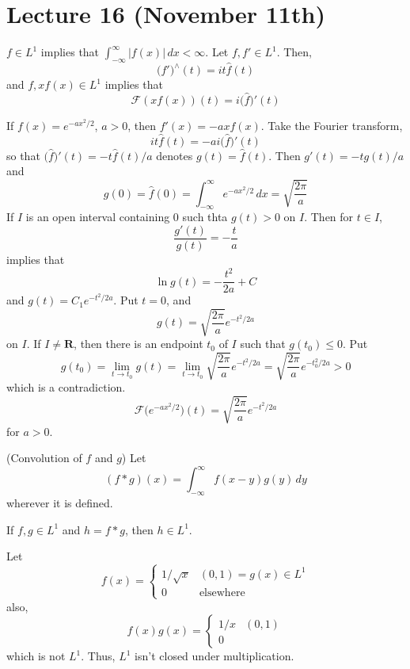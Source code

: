 \section{Lecture 16 (November 11th)}
\begin{thm}
$f\in L^{1}$ implies that $\int ^{\infty }_{-\infty }|f(x)|\,dx<\infty $. Let $f,f'\in L^{1}$. Then,
\[\big(f'\big)^{\wedge}(t)=it\hat{f}(t)\]
and $f,xf(x)\in L^{1}$ implies that
\[\mathcal{F}(xf(x))(t)=i\big(\hat{f}\big)'(t)\]
\end{thm}
\vspace{2ex}
\begin{ex}
If $f(x)=e^{-ax^2/2}$, $a>0$, then $f'(x)=-axf(x)$. Take the Fourier transform,
\[it\hat{f}(t)=-ai\big(\hat{f}\big)'(t)\]
so that $\big(\hat{f}\big)'(t)=-t\hat{f}(t)/a$ denotes $g(t)=\hat{f}(t)$. Then $g'(t)=-tg(t)/a$ and
\[g(0)=\hat{f}(0)=\int ^{\infty }_{-\infty }e^{-ax^2/2}\,dx=\sqrt{\dfrac{2\pi }{a}}\]
If $I$ is an open interval containing 0 such thta $g(t)>0$ on $I$. Then for $t\in I$,
\[\dfrac{g'(t)}{g(t)}=-\dfrac{t}{a} \]
implies that
\[\ln g(t)=-\dfrac{t^2}{2a}+C\]
and $g(t)=C_1e^{-t^2/2a}$. Put $t=0$, and 
\[g(t)=\sqrt{\dfrac{2\pi }{a}}e^{-t^2/2a}\]
on $I$. If $I\ne {\bm R}$, then there is an endpoint $t_0$ of $I$ such that $g(t_0)\leq 0$. Put 
\[g(t_0)=\lim _{t\rightarrow t_0}g(t)=\lim _{t\rightarrow t_0}\sqrt{\dfrac{2\pi }{a}}e^{-t^2/2a}=\sqrt{\dfrac{2\pi }{a}}e^{-t_0^2/2a}>0\]
which is a contradiction.
\[\mathcal{F}\Big(e^{-ax^2/2}\Big)(t)=\sqrt{\dfrac{2\pi }{a}}e^{-t^2/2a}\]
for $a>0$. 
\end{ex}
\vspace{2ex}
\begin{defi}
(Convolution of $f$ and $g$) Let
\[(f\ast g)(x)=\int ^{\infty }_{-\infty }f(x-y)g(y)\,dy\]
wherever it is defined. 
\end{defi}
\vspace{2ex}
\begin{thm}
If $f,g\in L^{1}$ and $h=f\ast g$, then $h\in L^{1}$.
\end{thm}
\vspace{2ex}
\begin{ex}
Let 
\[f(x)=\begin{cases}
1/\sqrt{x}&(0,1)=g(x)\in L^{1}\\
0&\mathrm{elsewhere}
\end{cases}\]
also,
\[f(x)g(x)=\begin{cases}
1/x&(0,1)\\
0
\end{cases}\]
which is not $L^{1}$. Thus, $L^{1}$ isn't closed under multiplication.
\end{ex}
